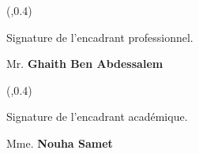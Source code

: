 \thispagestyle{empty}
\framebox(\textwidth,0.4\textheight){\raggedright Signature de l'encadrant professionnel.

    Mr. \textbf{Ghaith Ben Abdessalem} }
\mbox{}
\vfill
\framebox(\textwidth,0.4\textheight){\raggedright Signature de l'encadrant académique.

    Mme. \textbf{Nouha Samet}}